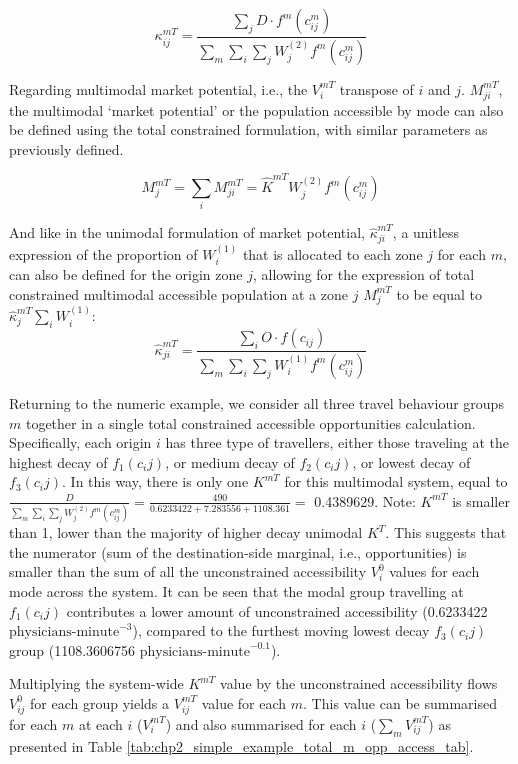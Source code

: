 \documentclass[
11pt, %
oneside, %
english, %
singlespacing, %
]{macthesis} %
\begin{document}
\[
\kappa_{ij}^{mT} = \frac{\sum_j D\cdot f^m(c^m_{ij})}{\sum_m\sum_i\sum_j W^{(2)}_jf^m(c^m_{ij})}
\]

Regarding multimodal market potential, i.e., the \(V_i^{mT}\) transpose of \(i\) and \(j\). \(M^{mT}_{ji}\), the multimodal `market potential' or the population accessible by mode can also be defined using the total constrained formulation, with similar parameters as previously defined.

\begin{equation}
\label{eq:total-constrained-multimodal-market}
M^{mT}_{j} = \sum_i M^{mT}_{ji} = \hat K^{mT} W_j^{(2)} f^m(c^m_{ij})
\end{equation} 

And like in the unimodal formulation of market potential, \(\hat \kappa_{ji}^{mT}\), a unitless expression of the proportion of \(W^{(1)}_i\) that is allocated to each zone \(j\) for each \(m\), can also be defined for the origin zone \(j\), allowing for the expression of total constrained multimodal accessible population at a zone \(j\) \(M^{mT}_j\) to be equal to \(\hat \kappa_j^{mT}\sum_i W^{(1)}_i\):
\[
\hat \kappa_{ji}^{mT} = \frac{\sum_i O \cdot f(c_{ij})}{\sum_m\sum_i\sum_j W^{(1)}_if^m(c^m_{ij})}
\]

Returning to the numeric example, we consider all three travel behaviour groups \(m\) together in a single total constrained accessible opportunities calculation. Specifically, each origin \(i\) has three type of travellers, either those traveling at the highest decay of \(f_1 (c_ij)\), or medium decay of \(f_2(c_ij)\), or lowest decay of \(f_3(c_ij)\). In this way, there is only one \(K^{mT}\) for this multimodal system, equal to \(\frac{D}{\sum_m\sum_i\sum_j W^{(2)}_jf^m(c^m_{ij})} = \frac{490}{0.6233422 + 7.283556 + 1108.361}=\) 0.4389629. Note: \(K^{mT}\) is smaller than 1, lower than the majority of higher decay unimodal \(K^T\). This suggests that the numerator (sum of the destination-side marginal, i.e., opportunities) is smaller than the sum of all the unconstrained accessibility \(V^{0}_i\) values for each mode across the system. It can be seen that the modal group travelling at \(f_1 (c_ij)\) contributes a lower amount of unconstrained accessibility (0.6233422 \(\text{physicians-minute}^{-3}\)), compared to the furthest moving lowest decay \(f_3(c_ij)\) group (1108.3606756 \(\text{physicians-minute}^{-0.1}\)).

Multiplying the system-wide \(K^{mT}\) value by the unconstrained accessibility flows \(V^{0}_{ij}\) for each group yields a \(V^{mT}_{ij}\) value for each \(m\). This value can be summarised for each \(m\) at each \(i\) (\(V^{mT}_{i}\)) and also summarised for each \(i\) (\(\sum_m V^{mT}_{ij}\)) as presented in Table \ref{tab:chp2_simple_example_total_m_opp_access_tab}.
\end{document}
